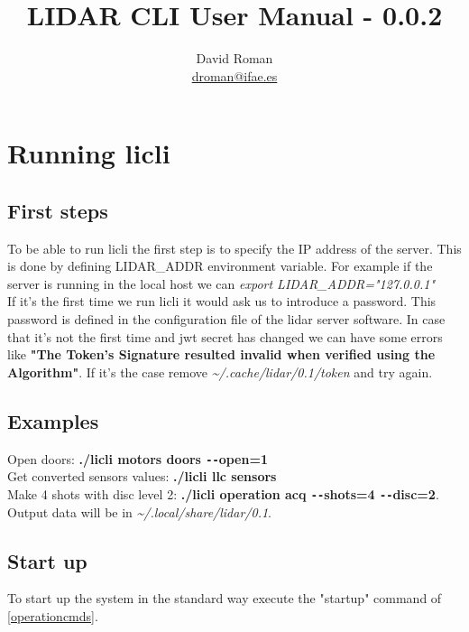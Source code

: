 \documentclass[letterpaper, 10 pt]{article}
\begin{document}
\title{LIDAR CLI User Manual - 0.0.2}
\author{David Roman \\  \href{mailto:droman@ifae.es}{droman@ifae.es} }
\maketitle
\pagestyle{empty}
\newpage
\tableofcontents
\newpage
{}
\pagestyle{plain}

\section{Running licli}
\subsection{First steps}
To be able to run licli the first step is to specify the IP address of the server. This is done by defining LIDAR\_ADDR environment variable. For example if the server is running in the local host we can \emph{export LIDAR\_ADDR="127.0.0.1"}\\
\linebreak
If it's the first time we run licli it would ask us to introduce a password. This password is defined in the configuration file of the lidar server software. 
In case that it's not the first time and jwt secret has changed we can have some errors like \textbf{"The Token's Signature resulted invalid when verified using the Algorithm"}. If it's the case remove \textit{\~{}/.cache/lidar/0.1/token} and try again.\\

\subsection{Examples}

Open doors: \textbf{./licli motors doors \texttt{-{}-}open=1}\\
Get converted sensors values: \textbf{./licli llc sensors}\\
Make 4 shots with disc level 2: \textbf{./licli operation acq \texttt{-{}-}shots=4 \texttt{-{}-}disc=2}. Output data will be in \textit{\~{}/.local/share/lidar/0.1}.

\subsection{Start up}
To start up the system in the standard way execute the "startup" command of \ref{operationcmds}.\\
\end{document}
